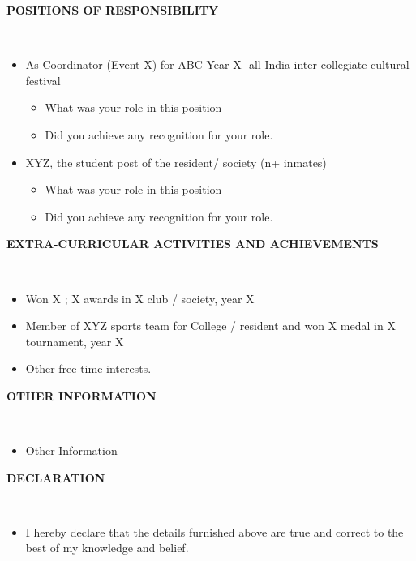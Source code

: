 \documentclass[a4paper,10pt]{article}
\newcommand{\lsep}{-0.5cm}
\newcommand{\resheading}[1]
{{
	\small \colorbox{mygrey}
	{\begin{minipage}
		{1.0\textwidth}
		{\textbf{#1 \vphantom{p\^{E}}}}
	\end{minipage}}
}}
\begin{document}
	\resheading{\textbf{POSITIONS OF RESPONSIBILITY} }\\[-0.4cm]
	\begin{itemize}
		\item As Coordinator (Event X) for ABC Year X- all India inter-collegiate cultural festival\\[\lsep]
		\begin{itemize}[noitemsep,topsep=0pt]
			\item What was your role in this position 
			\item Did you achieve any recognition for your role.
		\end{itemize}
		
		\item XYZ, the student post of the resident/ society (n+ inmates)\\[\lsep]
		\begin{itemize}[noitemsep,topsep=0pt]
			\item What was your role in this position 
			\item Did you achieve any recognition for your role.
		\end{itemize}

	\end{itemize}


	\resheading{\textbf{EXTRA-CURRICULAR ACTIVITIES AND ACHIEVEMENTS} }\\[-0.4cm]
	\indent 
	
	\begin{itemize}[noitemsep]
		\item \noindent Won X ; X awards in X club / society, year X
		\item \noindent Member of XYZ sports team for College / resident and won X medal in X tournament, year X
		\item \noindent Other free time interests.
	\end{itemize}
	
	\resheading{\textbf{OTHER INFORMATION} }\\[-0.4cm]
	\begin{itemize}
		\item \noindent Other Information
	\end{itemize}

	\resheading{\textbf{DECLARATION} }\\[-0.5cm]
	\begin{itemize}
		\item \noindent I hereby declare that the details furnished above are true and correct to the best of my knowledge and belief.
	\end{itemize}
\end{document}

